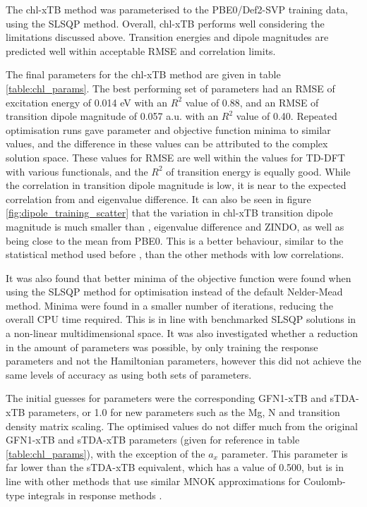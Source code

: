 The chl-xTB method was parameterised to the PBE0/Def2-SVP training data, using the
SLSQP method. Overall, chl-xTB performs well considering the limitations discussed 
above. Transition energies and dipole magnitudes are predicted well within acceptable
RMSE and correlation limits.

The final parameters for the chl-xTB method are given in table \ref{table:chl_params}.
The best performing set of parameters had an RMSE of excitation energy of 0.014 eV 
with an $R^2$ value of 0.88, and an RMSE of transition dipole magnitude of 0.057 a.u. 
with an $R^2$ value of 0.40. Repeated optimisation runs gave parameter and objective
function minima to similar values, and the difference in these values can be attributed
to the complex solution space. These values for RMSE are well within the values
for TD-DFT with various functionals, and the $R^2$ of transition energy is equally
good. While the correlation in transition dipole magnitude is low, it is near to
the expected correlation from \dscf and eigenvalue difference. It can also be seen
in figure \ref{fig:dipole_training_scatter} that the variation in chl-xTB transition
dipole magnitude is much smaller than \dscf, eigenvalue difference and ZINDO, as
well as being close to the mean from PBE0. This is a better behaviour, similar to
the statistical method used before \cite{Stross2016}, than the other methods with 
low correlations.

It was also found that better minima of the objective function were found when using
the SLSQP method for optimisation instead of the default Nelder-Mead method. Minima
were found in a smaller number of iterations, reducing the overall CPU time required.
This is in line with benchmarked SLSQP solutions in a non-linear multidimensional space.
It was also investigated whether a reduction in the amount of parameters was possible,
by only training the response parameters and not the Hamiltonian parameters, however 
this did not achieve the same levels of accuracy as using both sets of parameters.

The initial guesses for parameters were the corresponding GFN1-xTB and sTDA-xTB
parameters, or 1.0 for new parameters such as the Mg, N and transition density matrix
scaling. The optimised values do not differ much from the original GFN1-xTB and 
sTDA-xTB parameters (given for reference in table \ref{table:chl_params}), with
the exception of the $a_x$ parameter. This parameter is far lower than the sTDA-xTB
equivalent, which has a value of 0.500, but is in line with other methods that use 
similar MNOK approximations for Coulomb-type integrals in response methods \cite{Cho2021}.

